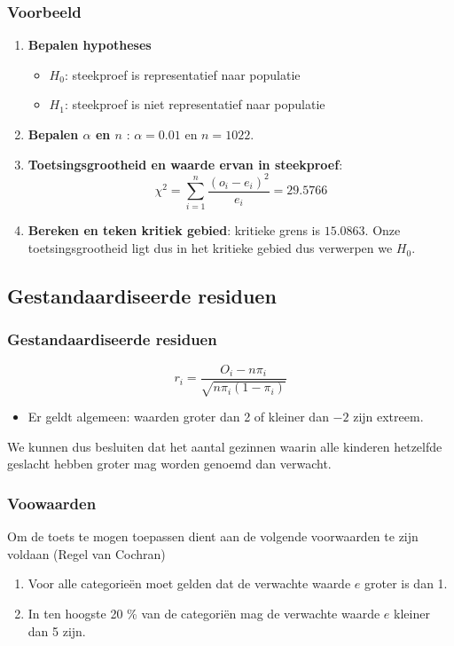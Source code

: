 \documentclass[aspectratio=169]{beamer}
\begin{document}
\begin{frame}
  \frametitle{Voorbeeld}
  \begin{enumerate}
  \item \textbf{Bepalen hypotheses}
    \begin{itemize}
      \item $H_{0}$: steekproef is representatief naar populatie
      \item $H_{1}$: steekproef is niet representatief naar populatie
    \end{itemize}
  \item \textbf{Bepalen $\alpha$ en $n$} : $\alpha = 0.01$ en $n = 1022$.
  \item \textbf{Toetsingsgrootheid en waarde ervan in steekproef}:
  \[ \chi^{2} = \sum_{i=1}^{n} \frac{(o_{i} - e_{i})^{2}}{e_{i}} = 29.5766 \]
  \item \textbf{Bereken en teken kritiek gebied}:  kritieke grens is $15.0863$. Onze toetsingsgrootheid ligt dus in het kritieke gebied dus verwerpen we $H_{0}$.
\end{enumerate}
\end{frame}

\subsection{Gestandaardiseerde residuen}
\begin{frame}
  \frametitle{Gestandaardiseerde residuen}
  \[ r_{i} = \frac{O_{i} - n \pi_{i}}{\sqrt{n \pi_{i}(1-\pi_{i})}} \]

  \begin{itemize}
    \item Er geldt algemeen: waarden groter dan 2 of kleiner dan $-2$ zijn extreem.
  \end{itemize}
  We kunnen dus besluiten dat het aantal gezinnen waarin alle kinderen hetzelfde geslacht hebben groter mag worden genoemd dan verwacht.

\end{frame}

\begin{frame}
  \frametitle{Voowaarden}
   Om de toets te mogen toepassen dient aan de volgende voorwaarden te zijn voldaan (Regel van Cochran)
\begin{enumerate}
  \item Voor alle categorie\"en moet gelden dat de verwachte waarde $e$ groter is dan 1.
  \item In ten hoogste 20 \% van de categori\"en mag de verwachte waarde $e$ kleiner dan 5 zijn.
\end{enumerate}
\end{frame}
\end{document}
